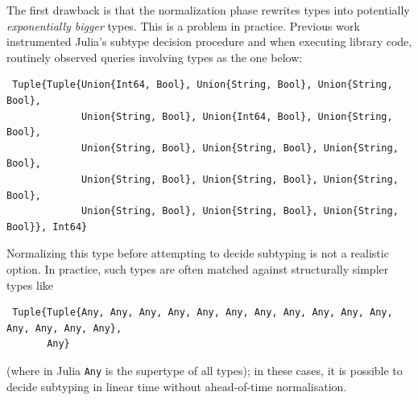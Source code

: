 \documentclass[a4paper,english]{lipics-v2019}
\begin{document}
The first
drawback is that the normalization phase rewrites types into
potentially \emph{exponentially bigger} types.
This is a problem in practice.  Previous work~\cite{DBLP:NardelliBPCBV18} instrumented
Julia's subtype decision procedure and when executing library code,
routinely observed queries involving types as the one below:
\begin{small}
\begin{verbatim}
 Tuple{Tuple{Union{Int64, Bool}, Union{String, Bool}, Union{String, Bool}, 
             Union{String, Bool}, Union{Int64, Bool}, Union{String, Bool}, 
             Union{String, Bool}, Union{String, Bool}, Union{String, Bool}, 
             Union{String, Bool}, Union{String, Bool}, Union{String, Bool}, 
             Union{String, Bool}, Union{String, Bool}, Union{String, Bool}}, Int64}
\end{verbatim}
\end{small}
Normalizing this type before attempting to decide subtyping is not a
realistic option. In practice, such types are often matched against
structurally simpler types like
\begin{small}
\begin{verbatim}
 Tuple{Tuple{Any, Any, Any, Any, Any, Any, Any, Any, Any, Any, Any, Any, Any, Any, Any}, 
       Any}
\end{verbatim}
\end{small}
(where in Julia \verb+Any+ is the supertype of all types); in these cases,
it is possible to decide subtyping in linear time without ahead-of-time normalisation.
\end{document}
